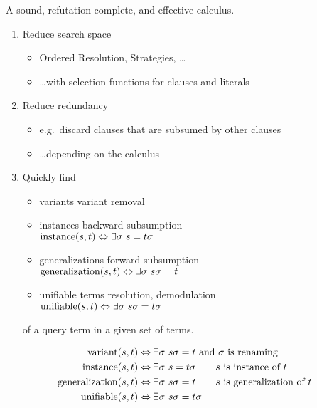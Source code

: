 \begin{goal}
	A sound, refutation complete, and
	 {effective} calculus.
	\begin{enumerate}
		\item {Reduce} search space
		\begin{itemize}
			\item Ordered Resolution, Strategies, \ldots
			\item \ldots with selection functions for clauses and literals
		\end{itemize}
		\item {Reduce} redundancy
		\begin{itemize}
			\item e.g.~discard clauses that are subsumed by other clauses
			\item \ldots depending on the calculus
		\end{itemize}
		\item Quickly find
		\begin{itemize}
			\item {variants} \hfill{\footnotesize variant removal}
			
			\item {instances}   \hfill{\footnotesize backward subsumption}\\
			$\operatorname{instance}(s,t)\Leftrightarrow\exists\sigma\ s = t\sigma$
			
			\item {generalizations}  \hfill{\footnotesize forward subsumption}\\
			$\GNRL(s,t)\Leftrightarrow\exists\sigma\ s\sigma = t$
			
			\item {unifiable terms} \hfill{\footnotesize resolution, demodulation}\\
			$\UNIF(s,t)\Leftrightarrow\exists\sigma\ s\sigma = t\sigma$
			
		\end{itemize}
		
		of a query term in a given set of terms.
	\end{enumerate}
\end{goal}

\begin{definition}
	\begin{align*}
	\operatorname{variant}(s,t)&\Leftrightarrow \exists\sigma\ s\sigma = t\text{ and }\sigma\text{ is renaming}\\
	\operatorname{instance}(s,t)&\Leftrightarrow\exists\sigma\ s = t\sigma\tag*{$s$ is instance of $t$}\\
	\operatorname{generalization}(s,t)&\Leftrightarrow\exists\sigma\ s\sigma = t\tag*{$s$ is generalization of $t$}\\
	\operatorname{unifiable}(s,t)&\Leftrightarrow\exists\sigma\ s\sigma = t\sigma
	\end{align*}
\end{definition}	

